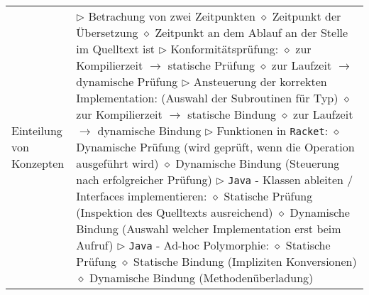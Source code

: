 \begin{tabular}{ | p{} p{} | }
	\makecell[l]{Einteilung von \\ Konzepten} & \makecell[l]{
	$\rhd$ Betrachung von zwei Zeitpunkten \\
	\hspace{0.4cm} $\diamond$ Zeitpunkt der Übersetzung \\
	\hspace{0.4cm} $\diamond$ Zeitpunkt an dem Ablauf an der Stelle im Quelltext ist \\
	$\rhd$ Konformitätsprüfung: \\
	\hspace{0.4cm} $\diamond$ zur Kompilierzeit $\rightarrow$ statische Prüfung \\
	\hspace{0.4cm} $\diamond$ zur Laufzeit $\rightarrow$ dynamische Prüfung \\
	$\rhd$ Ansteuerung der korrekten Implementation: (Auswahl der Subroutinen für Typ)\\
	\hspace{0.4cm} $\diamond$ zur Kompilierzeit $\rightarrow$ statische Bindung \\
	\hspace{0.4cm} $\diamond$ zur Laufzeit $\rightarrow$ dynamische Bindung \\
	$\rhd$ Funktionen in \texttt{Racket}: \\
	\hspace{0.4cm} $\diamond$ Dynamische Prüfung (wird geprüft, wenn die Operation ausgeführt wird) \\
	\hspace{0.4cm} $\diamond$ Dynamische Bindung (Steuerung nach erfolgreicher Prüfung) \\
	$\rhd$ \texttt{Java} - Klassen ableiten / Interfaces implementieren: \\
	\hspace{0.4cm} $\diamond$ Statische Prüfung (Inspektion des Quelltexts ausreichend) \\
	\hspace{0.4cm} $\diamond$ Dynamische Bindung (Auswahl welcher Implementation erst beim Aufruf) \\
	$\rhd$ \texttt{Java} - Ad-hoc Polymorphie: \\
	\hspace{0.4cm} $\diamond$ Statische Prüfung \\
	\hspace{0.4cm} $\diamond$ Statische Bindung (Impliziten Konversionen) \\
	\hspace{0.4cm} $\diamond$ Dynamische Bindung (Methodenüberladung) \\
}
\end{tabular}
